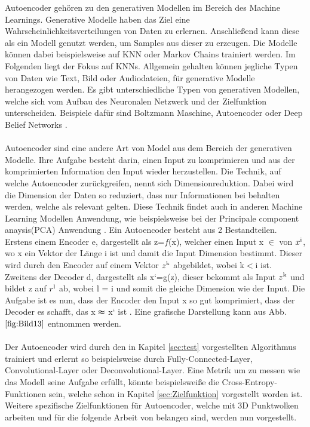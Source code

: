 \documentclass{llncs}
\begin{document}
Autoencoder gehören zu den generativen Modellen im Bereich des Machine Learnings. Generative Modelle haben das Ziel eine Wahrscheinlichkeitsverteilungen von Daten zu erlernen. Anschließend kann diese als ein Modell genutzt werden, um Samples aus dieser zu erzeugen. Die Modelle können dabei beispielsweise auf KNN oder Markov Chains trainiert werden. Im Folgenden liegt der Fokus auf KNNs. Allgemein gehalten können jegliche Typen von Daten wie Text, Bild oder Audiodateien, für generative Modelle herangezogen werden. Es gibt unterschiedliche Typen von generativen Modellen, welche sich vom Aufbau des Neuronalen Netzwerk und der Zielfunktion unterscheiden. Beispiele dafür sind Boltzmann Maschine, Autoencoder oder Deep Belief Networks \cite{Grundlagen}. 
\\\\
Autoencoder sind eine andere Art von Model aus dem Bereich der generativen Modelle. Ihre Aufgabe besteht darin, einen Input zu komprimieren und aus der komprimierten Information den Input wieder herzustellen. Die Technik, auf welche Autoencoder zurückgreifen, nennt sich Dimensionreduktion. Dabei wird die Dimension der Daten so reduziert, dass nur Informationen bei behalten werden, welche als relevant gelten. Diese Technik findet auch in anderen Machine Learning Modellen Anwendung, wie beispielsweise bei der Principale component anaysis(PCA) Anwendung \cite{dimreduction}.  Ein Autoencoder besteht aus 2 Bestandteilen. Erstens einem Encoder e, dargestellt als z=$f$(x), welcher einen Input x $\in$ von $x\textsuperscript{i}$, wo x ein Vektor der Länge i ist und damit die Input Dimension bestimmt. Dieser wird durch den Encoder auf einem Vektor $z\textsuperscript{k}$ abgebildet, wobei k$<$i ist. Zweitens der Decoder d, dargestellt als x`=g(z), dieser bekommt als Input $z\textsuperscript{k}$ und bildet z auf $r\textsuperscript{l}$ ab, wobei l = i und somit die gleiche Dimension wie der Input. Die Aufgabe ist es nun, dass der Encoder den Input x so gut komprimiert, dass der Decoder es schafft, das x $\thickapprox$ x` ist \cite{Grundlagen}. Eine grafische Darstellung kann aus Abb. $\ref{fig:Bild13}$ entnommen werden. 
\\\\
Der Autoencoder wird durch den in Kapitel \ref{sec:test} vorgestellten Algorithmus trainiert und erlernt so beispielsweise durch Fully-Connected-Layer,  Convolutional-Layer oder Deconvolutional-Layer. Eine Metrik um zu messen wie das Modell seine Aufgabe erfüllt, könnte beispielsweiße die Cross-Entropy-Funktionen sein, welche schon in Kapitel \ref{sec:Zielfunktion} vorgestellt worden ist. Weitere spezifische Zielfunktionen für Autoencoder, welche mit 3D Punktwolken arbeiten und für die folgende Arbeit von belangen sind, werden nun vorgestellt.
\end{document}

